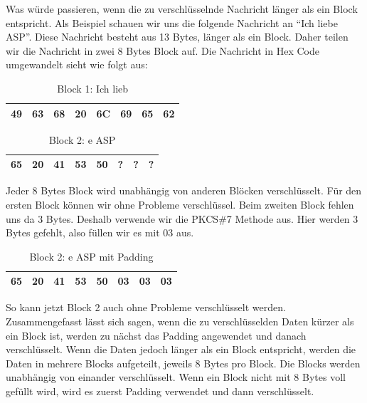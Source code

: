 \documentclass[course=asp]{aspdoc}
\begin{document}
Was würde passieren, wenn die zu verschlüsselnde Nachricht länger als ein Block entspricht. Als Beispiel schauen wir uns die folgende Nachricht an “Ich liebe ASP”. Diese Nachricht besteht aus 13 Bytes, länger als ein Block. Daher teilen wir die Nachricht in zwei 8 Bytes Block auf. Die Nachricht in Hex Code umgewandelt sieht wie folgt aus:
\begin{table}[H]
\centering
    \begin{tabular}{|l|l|l|l|l|l|l|l|}
        \hline
        49 & 63 & 68 & 20 & 6C & 69 & 65 & 62    \\
        \hline
    \end{tabular}
    \caption{Block 1: Ich lieb}
\end{table}

\begin{table}[H]
\centering
    \begin{tabular}{|l|l|l|l|l|l|l|l|}
        \hline
         65 & 20 & 41 & 53 & 50 & ?  & ? & ? \\
        \hline
    \end{tabular}
    \caption{Block 2: e ASP}
\end{table}

Jeder 8 Bytes Block wird unabhängig von anderen Blöcken verschlüsselt. Für den ersten Block können wir ohne Probleme verschlüssel. Beim zweiten Block fehlen uns da 3 Bytes. Deshalb verwende wir die PKCS\#7 Methode aus. Hier werden 3 Bytes gefehlt, also füllen wir es mit 03 aus.

\begin{table}[H]
\centering
    \begin{tabular}{|l|l|l|l|l|l|l|l|}
        \hline
         65 & 20 & 41 & 53 & 50 & 03  & 03 & 03 \\
        \hline
    \end{tabular}
    \caption{Block 2: e ASP mit Padding}
\end{table}
So kann jetzt Block 2 auch ohne Probleme verschlüsselt werden.\\
Zusammengefasst lässt sich sagen, wenn die zu verschlüsselden Daten kürzer als ein Block ist, werden zu nächst das Padding angewendet und danach verschlüsselt. Wenn die Daten jedoch länger als ein Block entspricht, werden die Daten in mehrere Blocks aufgeteilt, jeweils 8 Bytes pro Block. Die Blocks werden unabhängig von einander verschlüsselt. Wenn ein Block nicht mit 8 Bytes voll gefüllt wird, wird es zuerst Padding verwendet und dann verschlüsselt.


\newpage
\end{document}
